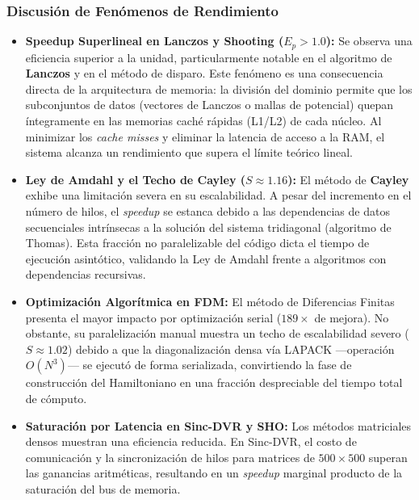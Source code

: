 \documentclass[11pt,fleqn]{article}
\begin{document}
\subsubsection{Discusión de Fenómenos de Rendimiento}

\begin{itemize}
    \item \textbf{Speedup Superlineal en Lanczos y Shooting ($E_p > 1.0$):} 
    Se observa una eficiencia superior a la unidad, particularmente notable en el algoritmo de \textbf{Lanczos} y en el método de disparo. Este fenómeno es una consecuencia directa de la arquitectura de memoria: la división del dominio permite que los subconjuntos de datos (vectores de Lanczos o mallas de potencial) quepan íntegramente en las memorias caché rápidas (L1/L2) de cada núcleo. Al minimizar los \textit{cache misses} y eliminar la latencia de acceso a la RAM, el sistema alcanza un rendimiento que supera el límite teórico lineal.
    
    \item \textbf{Ley de Amdahl y el Techo de Cayley ($S \approx 1.16$):} 
    El método de \textbf{Cayley} exhibe una limitación severa en su escalabilidad. A pesar del incremento en el número de hilos, el \textit{speedup} se estanca debido a las dependencias de datos secuenciales intrínsecas a la solución del sistema tridiagonal (algoritmo de Thomas). Esta fracción no paralelizable del código dicta el tiempo de ejecución asintótico, validando la Ley de Amdahl frente a algoritmos con dependencias recursivas.

    \item \textbf{Optimización Algorítmica en FDM:} 
    El método de Diferencias Finitas presenta el mayor impacto por optimización serial ($189\times$ de mejora). No obstante, su paralelización manual muestra un techo de escalabilidad severo ($S \approx 1.02$) debido a que la diagonalización densa vía LAPACK —operación $O(N^3)$— se ejecutó de forma serializada, convirtiendo la fase de construcción del Hamiltoniano en una fracción despreciable del tiempo total de cómputo.
    
    \item \textbf{Saturación por Latencia en Sinc-DVR y SHO:} 
    Los métodos matriciales densos muestran una eficiencia reducida. En Sinc-DVR, el costo de comunicación y la sincronización de hilos para matrices de $500 \times 500$ superan las ganancias aritméticas, resultando en un \textit{speedup} marginal producto de la saturación del bus de memoria.
\end{itemize}
\end{document}
